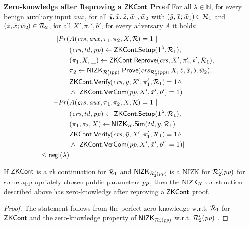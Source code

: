 \noindent \textbf{Zero-knowledge after Reproving a ${\mathsf{ZKCont}}$ Proof} For all $\lambda \in \mathbb{N}$, for every benign auxiliary input $aux$, 
for all $\bar{y},\bar{x},\bar{z}, \bar{w}_1, \bar{w}_2$ with $(\bar{y}, \bar{x}; \bar{w}_1) \in \mathcal{R}_1$ and $(\bar{z}, \bar{x}; \bar{w}_2) \in \mathcal{R}_2$, for all $X',\pi_1', b'$, for every adversary $A$ it holds:
\begin{align*}
| \mathit{Pr}(& A(\mathit{crs}, \mathit{aux}, \pi_1,\pi_2, X, \mathcal{R}) = 1 \ | \\ 
                    & (\mathit{crs}, \mathit{td}, \mathit{pp}) \leftarrow {\ensuremath{\mathsf{ZKCont}}}.{\mathsf{Setup}} (1^{\lambda}, \mathcal{R}_1), \\
                  &(\pi_1, X, \_) \leftarrow {\ensuremath{\mathsf{ZKCont}}}.{\mathsf{Reprove}} (\mathit{crs}, X', \pi_1', b', \mathcal{R}_1), \\
                  & \pi_2 \leftarrow {\ensuremath{\mathsf{NIZK_{\mathcal{R}'_2(\mathit{pp})}}}}.{\mathsf{Prove}}(\mathit{crs}_{\mathcal{R}'_2(\mathit{pp})}, X, \bar{z}, \bar{x}, b, \bar{w}_2), \\
                  &  {\mathsf{ZKCont}}.{\mathsf{Verify}}(\mathit{crs}, \bar{y}, X', \pi'_1, \mathcal{R}_1) = 1 \wedge \ \\
                  & \wedge \ {\mathsf{ZKCont}}.{\mathsf{VerCom}}(\mathit{pp}, X', \bar{x}', b') = 1)   \\
- \mathit{Pr}(& A(\mathit{crs}, \mathit{aux}, \pi_1,\pi_2, X, \mathcal{R}) = 1 \ | \\
                     & (\mathit{crs}, \mathit{td}, \mathit{pp}) \leftarrow {\ensuremath{\mathsf{ZKCont}}}.{\mathsf{Setup}} (1^{\lambda}, \mathcal{R}_1), \\ 
                     & (\pi_1,\pi_2, X) \leftarrow {\ensuremath{\mathsf{NIZK_{\mathcal{R}}}}}.{\mathsf{Sim}}(\mathit{td}, \bar{y}, \mathcal{R}_1) \\ 
                     &  {\mathsf{ZKCont}}.{\mathsf{Verify}}(\mathit{crs}, \bar{y}, X', \pi'_1, \mathcal{R}_1) = 1 \wedge \ \\
                     & \wedge \  {\mathsf{ZKCont}}.{\mathsf{VerCom}}(\mathit{pp}, X', \bar{x}', b') = 1) | \\
                    \leq \mathsf{negl}(\lambda)
\end{align*}

\begin{lemma} 
\label{le:specialZK_for_nizkR}
If ${\mathsf{ZKCont}}$ is a zk continuation for $\mathcal{R}_1$ and ${\mathsf{NIZK_{\mathcal{R}'_2(\mathit{pp})}}}$ is a NIZK for $\mathcal{R}_2'(\mathit{pp})$ for some appropriately chosen public parameters $\mathit{pp}$, 
then the ${\mathsf{NIZK_{\mathcal{R}}}}$ construction described above has zero-knowledge after reproving a ${\mathsf{ZKCont}}$ proof.
\end{lemma} 
\begin{proof} The statement follows from the perfect zero-knowledge w.r.t. $\mathcal{R}_1$ for ${\mathsf{ZKCont}}$ and 
the zero-knowledge property of ${\mathsf{NIZK_{\mathcal{R}'_2(\mathit{pp})}}}$ w.r.t. $\mathcal{R}_2'(\mathit{pp})$ .
\end{proof}
 
